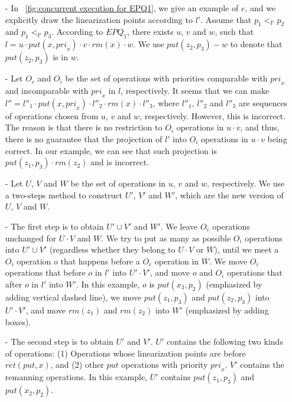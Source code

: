 \begin{itemize}
\setlength{\itemsep}{0.5pt}
\item[-] In \figurename~\ref{fig:concurrent execution for EPQ1}, we give an example of $e$, and we explicitly draw the linearization points according to $l'$. Assume that $p_1 <_{\mathbb{P}} p_2$ and $p_1 <_{\mathbb{P}} p_3$. According to $\textit{EPQ}_1$, there exists $u$, $v$ and $w$, such that $l = u \cdot \textit{put}(x,\textit{pri}_x) \cdot v \cdot \textit{rm}(x) \cdot w$. We use $\textit{put}(z_2,p_3)-w$ to denote that $\textit{put}(z_2,p_3)$ is in $w$.

\item[-] Let $O_c$ and $O_i$ be the set of operations with priorities comparable with $\textit{pri}_x$ and incomparable with $\textit{pri}_x$ in $l$, respectively. It seems that we can make $l''= l''_1 \cdot \textit{put}(x,\textit{pri}_x) \cdot l''_2 \cdot \textit{rm}(x) \cdot l''_3$, where $l''_1$, $l''_2$ and $l''_3$ are sequences of operations chosen from $u$, $v$ and $w$, respectively. However, this is incorrect. The reason is that there is no restriction to $O_i$ operations in $u \cdot v$, and thus, there is no guarantee that the projection of $l'$ into $O_i$ operations in $u \cdot v$ being correct. In our example, we can see that such projection is $\textit{put}(z_1,p_3) \cdot \textit{rm}(z_2)$ and is incorrect.

\item[-] Let $U$, $V$ and $W$ be the set of operations in $u$, $v$ and $w$, respectively. We use a two-steps method to construct $U'$, $V'$ and $W'$, which are the new version of $U$, $V$ and $W$.

\item[-] The first step is to obtain $U' \cup V'$ and $W'$. We leave $O_c$ operations unchanged for $U \cdot V$ and $W$. We try to put as many as possible $O_i$ operations into $U' \cup V'$ (regardless whether they belong to $U \cdot V$ or $W$), until we meet a $O_i$ operation $o$ that happens before a $O_c$ operation in $W$. We move $O_i$ operations that before $o$ in $l'$ into $U' \cdot V'$, and move $o$ and $O_i$ operations that after $o$ in $l'$ into $W'$. In this example, $o$ is $\textit{put}(x_3,p_2)$ (emphasized by adding vertical dashed line), we move $\textit{put}(z_1,p_3)$ and $\textit{put}(z_2,p_3)$ into $U' \cdot V'$, and move $\textit{rm}(z_1)$ and $\textit{rm}(z_2)$ into $W'$ (emphasized by adding boxes).

\item[-] The second step is to obtain $U'$ and $V'$. $U'$ contains the following two kinds of operations: (1) Operations whose linearization points are before $\textit{ret}(\textit{put},x)$, and (2) other $\textit{put}$ operations with priority $\textit{pri}_x$. $V'$ contains the remanning operations. In this example, $U'$ contains $\textit{put}(z_1,p_3)$ and $\textit{put}(x_2,p_2)$.


\end{itemize}
